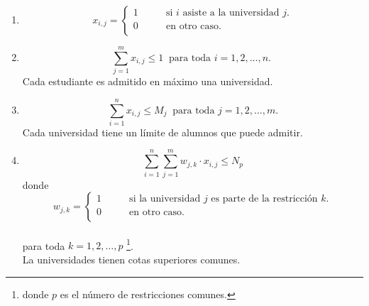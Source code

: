 \begin{enumerate}
\item \begin{equation} \label{r1}
x_{i,j}= 
\begin{cases}
1 & \qquad \text{si $i$ asiste a la universidad $j$.} \\
0 &\qquad\text{en otro caso.}\ \\ 
\end{cases} \end{equation}
\item \begin{equation} \label{r2}
\sum_{j=1}^{m}x_{i,j} \leq1 \ \text{ para toda $i=1,2,\ldots,n$. }
\end{equation} Cada estudiante es admitido en máximo una universidad. 
\item \begin{equation} \label{r3}
\sum_{i=1}^{n} x_{i,j} \leq M_j\ \text{ para toda $j=1,2,\dots,m$.} 
\end{equation}
Cada universidad tiene un límite de alumnos que puede admitir.
\item \begin{equation}
\sum_{i=1}^{n} \sum_{j=1}^m w_{j,k} \cdot x_{i,j} \leq N_p %
\end{equation} 
donde \begin{equation} w_{j,k}= 
\begin{cases}
1 & \qquad \text{si la universidad $j$ es parte de la restricción $k$.} \\
0 &\qquad\text{en otro caso.} \\ 
\end{cases} \end{equation} \\   para toda $k=1,2,\dots,p$   \footnote{donde $p$ es el número de restricciones comunes.}. \\
La universidades tienen cotas superiores comunes.



\end{enumerate}
